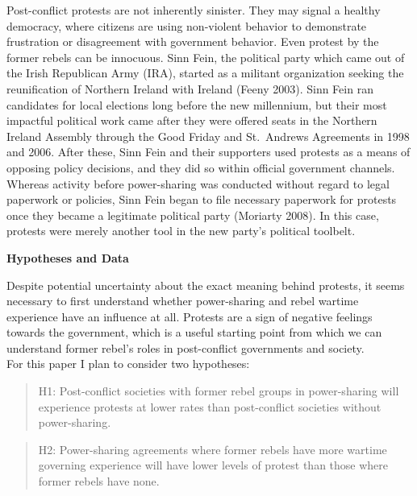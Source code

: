 \documentclass[12pt,]{article}
\begin{document}
Post-conflict protests are not inherently sinister. They may signal a
healthy democracy, where citizens are using non-violent behavior to
demonstrate frustration or disagreement with government behavior. Even
protest by the former rebels can be innocuous. Sinn Fein, the political
party which came out of the Irish Republican Army (IRA), started as a
militant organization seeking the reunification of Northern Ireland with
Ireland (Feeny 2003). Sinn Fein ran candidates for local elections long
before the new millennium, but their most impactful political work came
after they were offered seats in the Northern Ireland Assembly through
the Good Friday and St.~Andrews Agreements in 1998 and 2006. After
these, Sinn Fein and their supporters used protests as a means of
opposing policy decisions, and they did so within official government
channels. Whereas activity before power-sharing was conducted without
regard to legal paperwork or policies, Sinn Fein began to file necessary
paperwork for protests once they became a legitimate political party
(Moriarty 2008). In this case, protests were merely another tool in the
new party's political toolbelt.

\textbf{Hypotheses and Data}

Despite potential uncertainty about the exact meaning behind protests,
it seems necessary to first understand whether power-sharing and rebel
wartime experience have an influence at all. Protests are a sign of
negative feelings towards the government, which is a useful starting
point from which we can understand former rebel's roles in post-conflict
governments and society.\\
For this paper I plan to consider two hypotheses:

\begin{quote}
H1: Post-conflict societies with former rebel groups in power-sharing
will experience protests at lower rates than post-conflict societies
without power-sharing.
\end{quote}

\begin{quote}
H2: Power-sharing agreements where former rebels have more wartime
governing experience will have lower levels of protest than those where
former rebels have none.
\end{quote}
\end{document}
